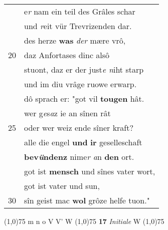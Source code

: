 \documentclass[8pt,a4paper,notitlepage]{article}
\begin{document}
\begin{table}[ht]
\begin{minipage}[t]{0.5\linewidth}
\begin{tabular}{rl}
 & e\textit{r} nam ein teil des Grâles schar\\ 
 & und \textit{r}eit vür Trevrizenden dar.\\ 
 & des herze \textbf{was} \textit{der} mære vrô,\\ 
20 & daz Anfortases dinc alsô\\ 
 & stuont, daz er der just\textit{e n}iht starp\\ 
 & und im diu vrâge ruowe erwarp.\\ 
 & dô sprach er: "got vil \textbf{tougen} hât.\\ 
 & wer g\textit{e}s\textit{a}z ie an sînen rât\\ 
25 & oder wer weiz ende sîner kraft?\\ 
 & alle die engel \textbf{und} \textbf{ir} geselleschaft\\ 
 & \textbf{bev\textit{ü}ndenz} nime\textit{r a}n \textbf{den} ort.\\ 
 & got ist \textbf{mensch} und sînes vater wort,\\ 
 & got ist vater und sun,\\ 
30 & sîn geist mac \textbf{wol} grôze helfe tuon."\\ 
\end{tabular}
\scriptsize
\line(1,0){75} \newline
m n o V V' W \newline
\line(1,0){75} \newline
\textbf{17} \textit{Initiale} W  \newline
\line(1,0){75} \newline

\end{minipage}
\end{table}
\end{document}
